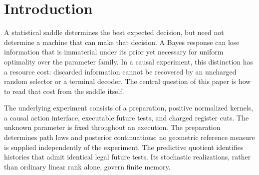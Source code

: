 \begin{abstract}
We study the memory required to attain a statistical saddle in a causal
experiment. For finite interfaces, admissible registers give normalized
positive realizations of the experiment's continuation channels. An
unrestricted minimax saddle determines an exposed Bayes face; optimal
finite-memory realizations must also satisfy contact and stationarity
at the supporting parameters. These additional conditions can fix
responses on Bayes ties and thereby force memory that a Bayes best
response alone would not require. For a continuous family of marked
product experiments we obtain exactly five states at the decision cut
of an optimal two-preparation audit. For serial validation with the
candidate read first, the minimum whole-schedule peak is exactly twelve.
Both converses include stochastic encoders and continuations. They are
proved by positive face packing, not by minimizing a chosen deterministic
machine. We also identify the all-preparation limiting value and derive
the closest-product geometry directly from the experimental probabilities.
Every least-favorable prior localizes near two intrinsic contact points;
symmetric priors converge to their equal mixture with an explicit
quadratic-transport bound. Prepared predictive quotients, causal
simulation, informative finite-memory control, exact one- and
two-preparation saddles, and positive-noise physical realization are
developed within the same resource framework.
\end{abstract}
\maketitle
\tableofcontents

\section{Introduction}
A statistical saddle determines the best expected decision, but need not
determine a machine that can make that decision. A Bayes response can
lose information that is immaterial under its prior yet necessary for
uniform optimality over the parameter family. In a causal experiment,
this distinction has a resource cost: discarded information cannot be
recovered by an uncharged random selector or a terminal decoder.
The central question of this paper is how to read that cost from the
saddle itself.

The underlying experiment consists of a preparation, positive normalized
kernels, a causal action interface, executable future tests, and charged
register cuts. The unknown parameter is fixed throughout an execution.
The preparation determines path laws and posterior continuations; no
geometric reference measure is supplied independently of the experiment.
The predictive quotient identifies histories that admit identical legal
future tests. Its stochastic realizations, rather than ordinary linear
rank alone, govern finite memory.


